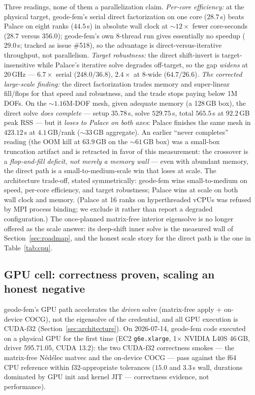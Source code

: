 \documentclass{anvil-paper}
\begin{document}
Three readings, none of them a parallelization claim. \emph{Per-core
efficiency:} at the physical target, geode-fem's serial direct
factorization on one core ($28.7$\,s) beats Palace on eight ranks
($44.5$\,s) in absolute wall clock at ${\sim}12\times$ fewer
core-seconds ($28.7$ versus $356.0$); geode-fem's own 8-thread run gives
essentially no speedup ($29.0$\,s; tracked as issue \#518), so the
advantage is direct-versus-iterative throughput, not parallelism.
\emph{Target robustness:} the direct shift-invert is target-insensitive
while Palace's iterative solve degrades off-target, so the gap
\emph{widens} at 20\,GHz --- $6.7\times$ serial ($248.0/36.8$),
$2.4\times$ at 8-wide ($64.7/26.6$). \emph{The corrected large-scale
finding:} the direct factorization trades memory and super-linear
fill/flops for that speed and robustness, and the trade stops paying
below 1M DOFs. On the ${\sim}1.16$M-DOF mesh, given adequate memory
(a 128\,GB box), the direct solve \emph{does complete} --- setup
$35.78$\,s, solve $529.75$\,s, total $565.5$\,s at $92.2$\,GB peak RSS
--- but it \emph{loses to Palace on both axes}: Palace finishes the same
mesh in $423.12$\,s at $4.1$\,GB/rank (${\sim}33$\,GB aggregate). An
earlier ``never completes'' reading (the OOM kill at $63.9$\,GB on the
${\sim}61$\,GB box) was a small-box truncation artifact and is retracted
in favor of this measurement: the crossover is a \emph{flop-and-fill
deficit, not merely a memory wall} --- even with abundant memory, the
direct path is a small-to-medium-scale win that loses at scale. The
architecture trade-off, stated symmetrically: geode-fem wins
small-to-medium on speed, per-core efficiency, and target robustness;
Palace wins at scale on both wall clock and memory. (Palace at 16 ranks
on hyperthreaded vCPUs was refused by MPI process binding; we exclude it
rather than report a degraded configuration.) The once-planned
matrix-free interior eigensolve is no longer offered as the scale
answer: its deep-shift inner solve is the measured wall of
Section~\ref{sec:roadmap}, and the honest scale story for the direct
path is the one in Table~\ref{tab:cpu}.

\subsection{GPU cell: correctness proven, scaling an honest negative}
\label{sec:perf-gpu}

geode-fem's GPU path accelerates the \emph{driven} solve (matrix-free
apply + on-device COCG), not the eigensolve of the credential, and all
GPU execution is CUDA-f32 (Section~\ref{sec:architecture}). On
2026-07-14, geode-fem code executed on a physical GPU for the first time
(EC2 \texttt{g6e.xlarge}, 1$\times$ NVIDIA L40S 46\,GB, driver
595.71.05, CUDA 13.2): the two CUDA-f32 correctness smokes --- the
matrix-free N\'ed\'elec matvec and the on-device COCG --- pass against
the f64 CPU reference within f32-appropriate tolerances ($15.0$ and
$3.3$\,s wall, durations dominated by GPU init and kernel JIT ---
correctness evidence, not performance).
\end{document}
